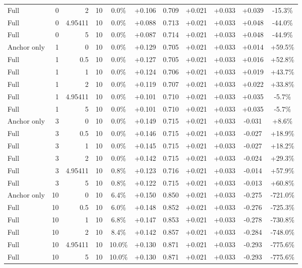 \begin{table}[htbp]
\begin{tabular}{lrrrccccccc}
Full & 0 & 2 & 10 & 0.0\% & +0.106 & 0.709 & +0.021 & +0.033 & +0.039 & -15.3\% \\
Full & 0 & 4.95411 & 10 & 0.0\% & +0.088 & 0.713 & +0.021 & +0.033 & +0.048 & -44.0\% \\
Full & 0 & 5 & 10 & 0.0\% & +0.087 & 0.714 & +0.021 & +0.033 & +0.048 & -44.9\% \\
Anchor only & 1 & 0 & 10 & 0.0\% & +0.129 & 0.705 & +0.021 & +0.033 & +0.014 & +59.5\% \\
Full & 1 & 0.5 & 10 & 0.0\% & +0.127 & 0.705 & +0.021 & +0.033 & +0.016 & +52.8\% \\
Full & 1 & 1 & 10 & 0.0\% & +0.124 & 0.706 & +0.021 & +0.033 & +0.019 & +43.7\% \\
Full & 1 & 2 & 10 & 0.0\% & +0.119 & 0.707 & +0.021 & +0.033 & +0.022 & +33.8\% \\
Full & 1 & 4.95411 & 10 & 0.0\% & +0.101 & 0.710 & +0.021 & +0.033 & +0.035 & -5.7\% \\
Full & 1 & 5 & 10 & 0.0\% & +0.101 & 0.710 & +0.021 & +0.033 & +0.035 & -5.7\% \\
Anchor only & 3 & 0 & 10 & 0.0\% & +0.149 & 0.715 & +0.021 & +0.033 & -0.031 & +8.6\% \\
Full & 3 & 0.5 & 10 & 0.0\% & +0.146 & 0.715 & +0.021 & +0.033 & -0.027 & +18.9\% \\
Full & 3 & 1 & 10 & 0.0\% & +0.145 & 0.715 & +0.021 & +0.033 & -0.027 & +18.2\% \\
Full & 3 & 2 & 10 & 0.0\% & +0.142 & 0.715 & +0.021 & +0.033 & -0.024 & +29.3\% \\
Full & 3 & 4.95411 & 10 & 0.8\% & +0.123 & 0.716 & +0.021 & +0.033 & -0.014 & +57.9\% \\
Full & 3 & 5 & 10 & 0.8\% & +0.122 & 0.715 & +0.021 & +0.033 & -0.013 & +60.8\% \\
Anchor only & 10 & 0 & 10 & 6.4\% & +0.150 & 0.850 & +0.021 & +0.033 & -0.275 & -721.0\% \\
Full & 10 & 0.5 & 10 & 6.0\% & +0.148 & 0.852 & +0.021 & +0.033 & -0.276 & -725.3\% \\
Full & 10 & 1 & 10 & 6.8\% & +0.147 & 0.853 & +0.021 & +0.033 & -0.278 & -730.8\% \\
Full & 10 & 2 & 10 & 8.4\% & +0.142 & 0.857 & +0.021 & +0.033 & -0.284 & -748.0\% \\
Full & 10 & 4.95411 & 10 & 10.0\% & +0.130 & 0.871 & +0.021 & +0.033 & -0.293 & -775.6\% \\
Full & 10 & 5 & 10 & 10.0\% & +0.130 & 0.871 & +0.021 & +0.033 & -0.293 & -775.6\% \\

\end{tabular}
\end{table}
